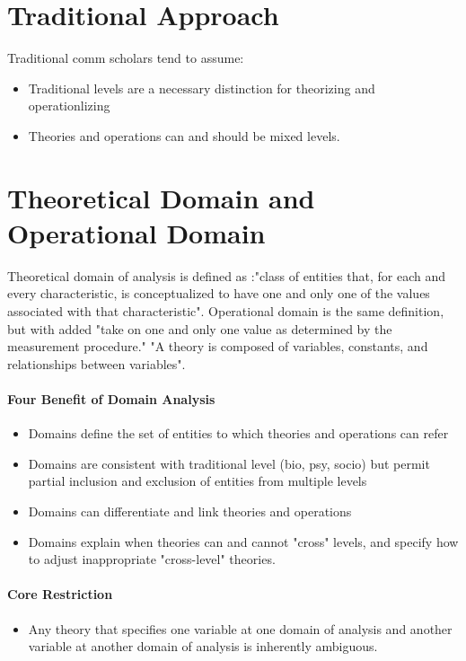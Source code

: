 \section{Traditional Approach}
Traditional comm scholars tend to assume: 
    \begin{itemize}
        \item Traditional levels are a necessary distinction for theorizing and operationlizing 
        \item Theories and operations can and should be mixed levels. 
    \end{itemize}


\section{Theoretical Domain and Operational Domain} 
Theoretical domain of analysis is defined as :"class of entities that, for each and every characteristic, is conceptualized to have one and only one of the values associated with that characteristic". Operational domain is the same definition, but with added "take on one and only one value as determined by the measurement procedure."  "A theory is composed of variables, constants, and relationships between variables". 

\paragraph{Four Benefit of Domain Analysis} 
\begin{itemize}
    \item Domains define the set of entities to which theories and operations can refer 
    \item Domains are consistent with traditional level (bio, psy, socio) but permit partial inclusion and exclusion of entities from multiple levels 
    \item Domains can differentiate and link theories and operations
    \item Domains explain when theories can and cannot "cross" levels, and specify how to adjust inappropriate "cross-level" theories. 
\end{itemize}

\paragraph{Core Restriction}
\begin{itemize}
    \item Any theory that specifies one variable at one domain of analysis and another variable at another domain of analysis is inherently ambiguous. 
\end{itemize}